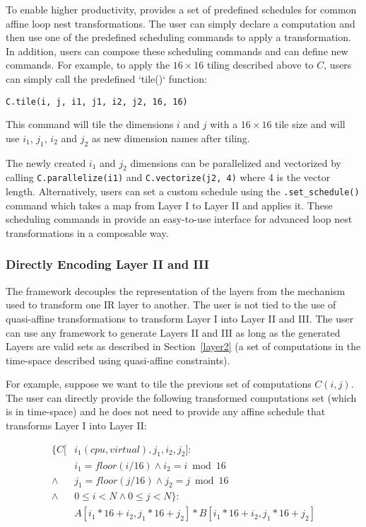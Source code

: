 To enable higher productivity, \framework provides a set of predefined schedules for common affine loop nest transformations.  The user can simply declare a computation and then use one of the predefined scheduling commands to apply a transformation.  In addition, users can compose these scheduling commands and can define new commands.  For example, to apply the $16\times16$ tiling described above to $C$, users can simply call the predefined `tile()` function:

\lstinline{C.tile(i, j, i1, j1, i2, j2, 16, 16)}

This command will tile the dimensions $i$ and $j$ with a $16\times16$ tile size and will use $i_1$, $j_1$, $i_2$ and $j_2$ as new dimension names after tiling.

The newly created $i_1$ and $j_2$ dimensions can be parallelized and vectorized by calling \lstinline{C.parallelize(i1)} and \lstinline{C.vectorize(j2, 4)} where 4 is the vector length.
Alternatively, users can set a custom schedule using the \lstinline{.set_schedule()} command which takes a map from Layer I to Layer II and applies it.
These scheduling commands in \framework provide an easy-to-use interface for advanced loop nest transformations in a composable way.

\subsubsection{Directly Encoding Layer II and III}

The \framework framework decouples the representation of the layers from the mechanism used to transform one IR layer to another.  The user is not tied to the use of quasi-affine transformations to transform Layer I into Layer II and III.  The user can use any framework to generate Layers II and III as long as the generated Layers are valid sets as described in Section~\ref{layer2} (a set of computations in the time-\processor space described using quasi-affine constraints).

For example, suppose we want to tile the previous set of computations $C(i,j)$.  The user can directly provide the following transformed computations set  (which is in time-\processor space) and he does not need to provide any affine schedule that transforms Layer I into Layer II:

\begin{align*}
\{C[& i_1 (cpu, virtual), j_1, i_2, j_2]:  \\
    & i_1=floor(i/16) \wedge i_2=i\bmod 16 \\
   \wedge &  j_1=floor(j/16) \wedge j_2=j\bmod 16 \\
   \wedge & 0\leq i < N \wedge 0\leq j < N \}:\\
   & A[i_1*16+i_2, j_1*16+j_2] * B[i_1*16+i_2, j_1*16+j_2]
\end{align*}

